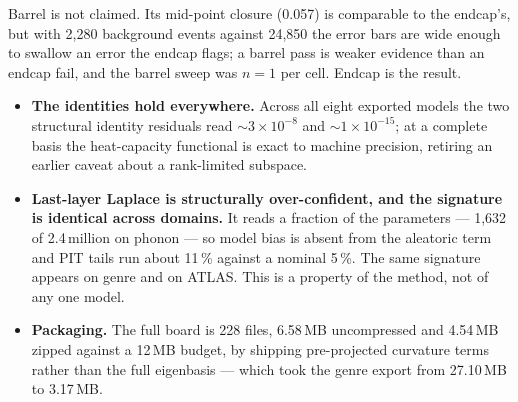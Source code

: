 \documentclass[11pt]{article}
\begin{document}
Barrel is not claimed. Its mid-point closure (0.057) is comparable to the
endcap's, but with 2{,}280 background events against 24{,}850 the error bars
are wide enough to swallow an error the endcap flags; a barrel pass is weaker
evidence than an endcap fail, and the barrel sweep was $n=1$ per cell. Endcap
is the result.


\begin{itemize}[leftmargin=1.4em]\setlength{\itemsep}{3pt}
  \item \textbf{The identities hold everywhere.} Across all eight exported
        models the two structural identity residuals read $\sim\!3\times10^{-8}$
        and $\sim\!1\times10^{-15}$; at a complete basis the heat-capacity
        functional is exact to machine precision, retiring an earlier caveat
        about a rank-limited subspace.
  \item \textbf{Last-layer Laplace is structurally over-confident, and the
        signature is identical across domains.} It reads a fraction of the
        parameters --- 1{,}632 of 2.4\,million on phonon --- so model bias is
        absent from the aleatoric term and PIT tails run about 11\,\% against a
        nominal 5\,\%. The same signature appears on genre and on ATLAS. This
        is a property of the method, not of any one model.
  \item \textbf{Packaging.} The full board is 228 files, 6.58\,MB
        uncompressed and 4.54\,MB zipped against a 12\,MB budget, by shipping
        pre-projected curvature terms rather than the full eigenbasis --- which
        took the genre export from 27.10\,MB to 3.17\,MB.
\end{itemize}




\end{document}
